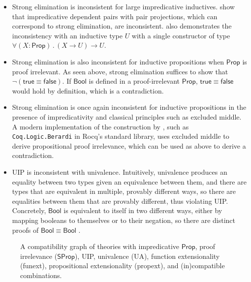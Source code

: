 \documentclass{article}
\newcommand{\kw}[1]{\mathsf{#1}}
\newcommand{\code}[1]{\texttt{#1}}
\begin{document}
\begin{itemize}[noitemsep,topsep=0pt]
  \item Strong elimination is inconsistent for large impredicative inductives.
    \citet{strong-pair} show that impredicative dependent pairs with pair projections,
    which can correspond to strong elimination,
    are inconsistent.
    \citet{trees} also demonstrates the inconsistency with an inductive type $U$
    with a single constructor of type
    $\forall (X : \kw{Prop})\mathpunct{.} (X \to U) \to U$.
  \item Strong elimination is also inconsistent for inductive propositions
    when $\kw{Prop}$ is proof irrelevant.
    As seen above, strong elimination suffices to show that $\neg (\kw{true} \equiv \kw{false})$.
    If $\kw{Bool}$ is defined in a proof-irrelevant $\kw{Prop}$,
    $\kw{true} \equiv \kw{false}$ would hold by definition,
    which is a contradiction.
  \item Strong elimination is once again inconsistent for inductive propositions
    in the presence of impredicativity and classical principles such as excluded middle.
    A modern implementation of the construction by \cite{em-irr},
    such as \code{Coq.Logic.Berardi} in Rocq's standard library,
    uses excluded middle to derive propositional proof irrelevance,
    which can be used as above to derive a contradiction.
  \item UIP is inconsistent with univalence.
    Intuitively, univalence produces an equality between two types
    given an equivalence between them,
    and there are types that are equivalent in multiple, provably different ways,
    so there are equalities between them that are provably different,
    thus violating UIP.
    Concretely, $\kw{Bool}$ is equivalent to itself in two different ways,
    either by mapping booleans to themselves or to their negation,
    so there are distinct proofs of $\kw{Bool} \equiv \kw{Bool}$
    \citep[Example 3.1.9]{hott}.
\end{itemize}

\begin{figure}[h]
\centering
{}
\caption{A compatibility graph of theories with impredicative $\kw{Prop}$, proof irrelevance ($\kw{SProp}$),
  UIP, univalence (UA), function extensionality (funext), propositional extensionality (propext),
  and (in)compatible combinations.}
\label{fig:lattice}
\end{figure}
\end{document}
